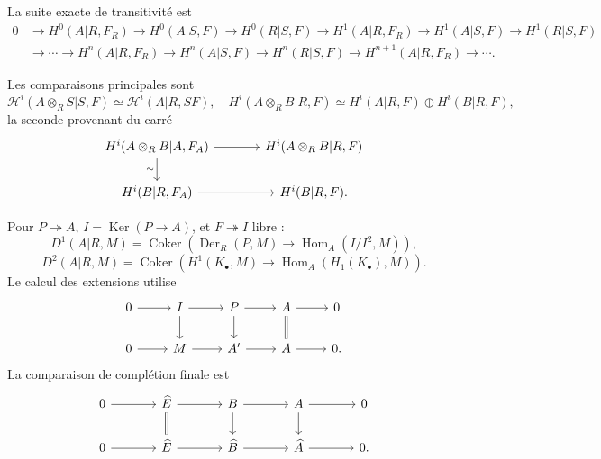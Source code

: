 \documentclass[11pt]{article}
\providecommand{\Ker}{\operatorname{Ker}}
\providecommand{\Hom}{\operatorname{Hom}}
\providecommand{\Der}{\operatorname{Der}}
\providecommand{\Coker}{\operatorname{Coker}}
\providecommand{\cH}{\mathcal H}
\providecommand{\Ahat}{\widehat A}
\providecommand{\Bhat}{\widehat B}
\providecommand{\Ehat}{\widehat E}
\begin{document}
La suite exacte de transitivité est
\[
\begin{aligned}
0&\to H^0(A|R,F_R)\to H^0(A|S,F)\to H^0(R|S,F)\to H^1(A|R,F_R)\to H^1(A|S,F)\to H^1(R|S,F)\\
&\to\cdots\to H^n(A|R,F_R)\to H^n(A|S,F)\to H^n(R|S,F)\to H^{n+1}(A|R,F_R)\to\cdots .
\end{aligned}
\]

Les comparaisons principales sont
\[
\cH^i(A\otimes_RS|S,F)\simeq\cH^i(A|R,SF),
\quad
H^i(A\otimes_RB|R,F)\simeq H^i(A|R,F)\oplus H^i(B|R,F),
\]
la seconde provenant du carré
\[
\begin{tikzcd}[column sep=large]
H^i(A\otimes_RB|A,F_A) \arrow[r] \arrow[d,"\sim"'] & H^i(A\otimes_RB|R,F) \\
H^i(B|R,F_A) \arrow[r] & H^i(B|R,F).
\end{tikzcd}
\]

Pour \(P\twoheadrightarrow A\), \(I=\Ker(P\to A)\), et \(F\twoheadrightarrow I\) libre :
\[
D^1(A|R,M)=\Coker(\Der_R(P,M)\to\Hom_A(I/I^2,M)),
\]
\[
D^2(A|R,M)=\Coker(H^1(K_\bullet,M)\to\Hom_A(H_1(K_\bullet),M)).
\]
Le calcul des extensions utilise
\[
\begin{tikzcd}
0\arrow[r]&I\arrow[r]\arrow[d]&P\arrow[r]\arrow[d]&A\arrow[r]\arrow[d,equal]&0\\
0\arrow[r]&M\arrow[r]&A'\arrow[r]&A\arrow[r]&0.
\end{tikzcd}
\]
La comparaison de complétion finale est
\[
\begin{tikzcd}[column sep=large]
0\arrow[r]&\Ehat\arrow[r]\arrow[d,equal]&B\arrow[r]\arrow[d]&A\arrow[r]\arrow[d]&0\\
0\arrow[r]&\Ehat\arrow[r]&\Bhat\arrow[r]&\Ahat\arrow[r]&0.
\end{tikzcd}
\]
\end{document}
